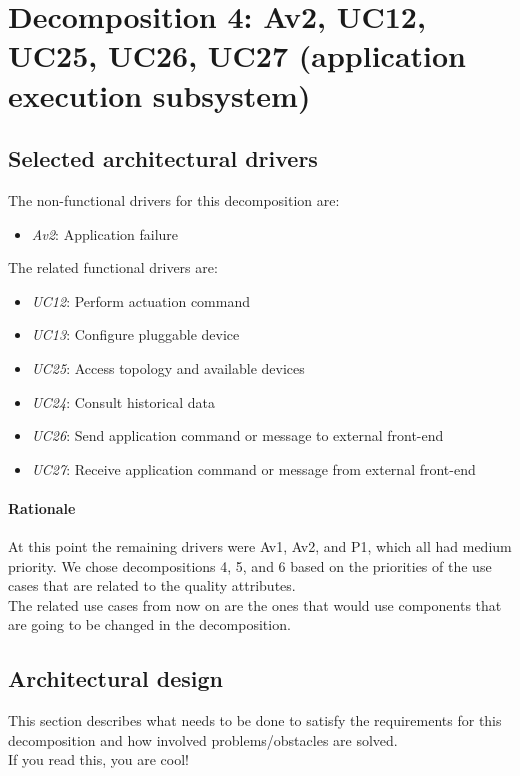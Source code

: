 \section{Decomposition 4: Av2, UC12, UC25, UC26, UC27 (application execution subsystem)}


\subsection{Selected architectural drivers}
    The non-functional drivers for this decomposition are:
    \begin{itemize}
    	\item \emph{Av2}: Application failure
    \end{itemize}

    The related functional drivers are:
    \begin{itemize}
        \item \emph{UC12}: Perform actuation command
        \item \emph{UC13}: Configure pluggable device
        \item \emph{UC25}: Access topology and available devices
        \item \emph{UC24}: Consult historical data
        \item \emph{UC26}: Send application command or message to external front-end
        \item \emph{UC27}: Receive application command or message from external front-end
    \end{itemize}

    \paragraph{Rationale}
        At this point the remaining drivers were Av1, Av2, and P1,
        which all had medium priority. We chose decompositions 4, 5,
        and 6 based on the priorities of the use cases that are related to the quality attributes. \\
        The related use cases from now on are the ones that would use components
        that are going to be changed in the decomposition.


\subsection{Architectural design}
    This section describes what needs to be done to satisfy the requirements for
    this decomposition and how involved problems/obstacles are solved. \\
    If you read this, you are cool!

